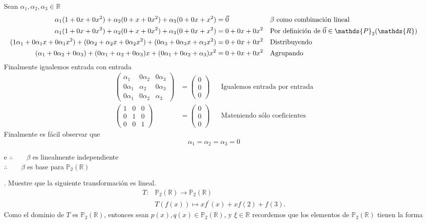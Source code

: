 \documentclass[letterpaper]{article}
\newcommand{\R}{\mathds{R}}
\newcommand{\Po}{\mathds{P}_2(\mathds{R})}
\renewcommand{\*}{\cdot}
\newcommand{\Iden}{\begin{pmatrix}
		1 & 0 & 0\\
		0 & 1 & 0\\
		0 & 0 & 1 
\end{pmatrix}}
\theoremstyle{definition}
\begin{document}
Sean $ \alpha_1, \alpha_2, \alpha_3 \in \R $ 
\begin{align*}
	\alpha_1(1 + 0x + 0x^2) + \alpha_2(0 + x + 0x^2) + \alpha_3(0 + 0x + x^2) &= \vec{0} && \text{$ \beta $ como combinación lineal}\\
	\alpha_1(1 + 0x + 0x^2) + \alpha_2(0 + x + 0x^2) + \alpha_3(0 + 0x + x^2) &= 0 + 0x + 0x^2 && \text{Por definición de $ \vec{0} \in \Po $}\\
	(1\alpha_1 + 0\alpha_1x + 0\alpha_1x^2) + (0\alpha_2 + \alpha_2x + 0\alpha_2x^2) + (0\alpha_3 + 0\alpha_3x + \alpha_3x^2) &= 0 + 0x + 0x^2  && \text{Distribuyendo}\\
	(\alpha_1 + 0\alpha_2 + 0\alpha_3) + (0\alpha_1 + \alpha_2 + 0\alpha_3)x + (0\alpha_1 + 0\alpha_2 + \alpha_3)x^2 &= 0 + 0x + 0x^2 && \text{Agrupando}
\end{align*}
Finalmente igualemos entrada con entrada
\begin{align*}
	\begin{pmatrix}
	\alpha_1 & 0\alpha_2 & 0\alpha_3\\
	0\alpha_1 & \alpha_2 & 0\alpha_3\\
	0\alpha_1 & 0\alpha_2 & \alpha_3 
	\end{pmatrix} 
	& = \begin{pmatrix}
	0\\
	0\\
	0
	\end{pmatrix} && \text{Igualemos entrada por entrada}\\
	\Iden & = \begin{pmatrix}
	0\\
	0\\
	0
	\end{pmatrix} && \text{Mateniendo sólo coeficientes}
\end{align*}
Finalmente es fácil observar que 
\[ \alpha_1 = \alpha_2 = \alpha_3 = 0  \]
\begin{center}e
	$ \therefore \qquad \beta$ es linealmente independiente\\
	$ \therefore \qquad \beta$ es base para $ \Po $
\end{center}
. Muestre que la siguiente transformación es lineal.
\begin{align*}
     T \colon & \mathbb{P}_{2}(\mathbb{R})  \longrightarrow \mathbb{P}_{2}(\mathbb{R}) \\
     & T(f(x)) \mapsto  xf^{'}(x) +x f(2) + f(3).
 \end{align*}
Como el dominio de $ T $ es $ \Po $, entonces sean $ p(x), q(x) \in \Po $, y $ \xi \in \R $ recordemos que los elementos de $ \Po $ tienen la forma
\end{document}
